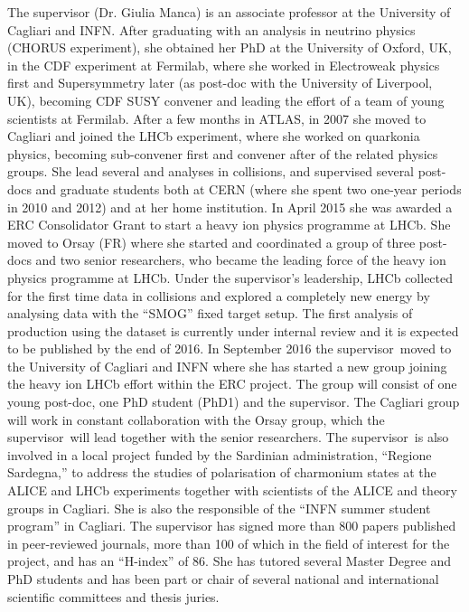 \documentclass[a4paper,11pt]{article}
\newcommand{\supervisor}{the supervisor\xspace}
\newcommand{\Supervisor}{The supervisor\xspace}
\begin{document}
The supervisor (Dr. Giulia Manca) is an associate professor at the 
University of Cagliari and INFN. After graduating with an 
analysis in neutrino physics (CHORUS experiment), she obtained her 
PhD at the University of Oxford, UK, in the CDF experiment at Fermilab,
where she worked in Electroweak physics first and Supersymmetry later
(as post-doc with the University of Liverpool, UK), becoming 
CDF SUSY convener and leading the effort of a team of young scientists
at Fermilab.
After a few months in ATLAS, in 2007 she moved to Cagliari and 
joined the LHCb experiment, where she worked on quarkonia physics, 
becoming sub-convener first and convener after of the related physics groups.
She lead several \Jpsi and \PgU analyses in \pp
collisions, and supervised several post-docs and graduate 
students both at CERN (where she spent two one-year periods
in 2010 and 2012) and at her home institution. In April 2015 she
was awarded a ERC Consolidator Grant to start a heavy ion physics 
programme at LHCb. She moved to Orsay (FR) 
where she started and coordinated a group of three post-docs and 
two senior researchers, who became the leading force of the 
heavy ion physics programme at LHCb. Under \supervisor's 
leadership, LHCb collected for the first time data in \PbPb 
collisions and explored a completely new energy by analysing
data with the ``SMOG'' fixed target setup.
The first analysis of \JPsi production using the \PbPb dataset 
is currently under internal review
and it is expected to be published by the end of 2016. 
In September 2016 \supervisor\ moved to the University of Cagliari and INFN where 
she has started a new group joining the heavy ion LHCb effort within 
the ERC project. The group will consist
of one young post-doc, one PhD student (PhD1) and \supervisor. 
The Cagliari group will work 
in constant collaboration with the Orsay group, which \supervisor\
will lead together with the senior researchers. 
\Supervisor\ is also involved in a local project funded by the 
Sardinian administration, ``Regione Sardegna,'' to address the studies of 
polarisation of charmonium states at the ALICE and LHCb experiments
together with scientists of the ALICE and theory groups in Cagliari.
She is also the responsible of the ``INFN summer student program'' in 
Cagliari.
\Supervisor has signed more than 800 
papers published in peer-reviewed journals, more than 100 of which 
in the field of interest for the project, and has an ``H-index'' of 86.
She has tutored several Master Degree and PhD students and has
 been part or chair of several national
and international scientific committees and thesis juries.
\end{document}
